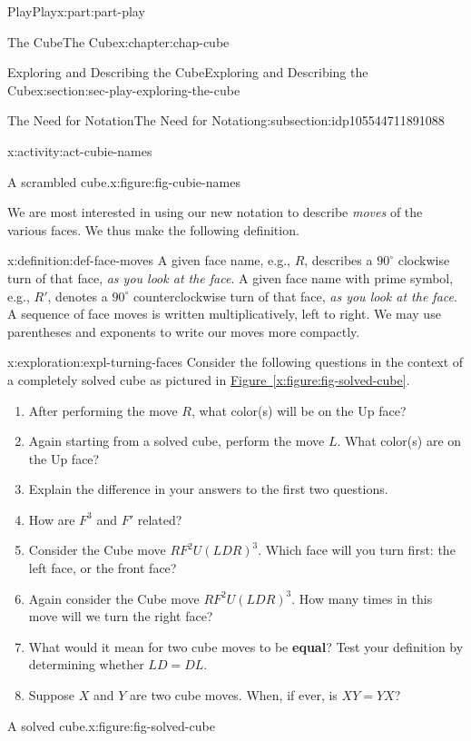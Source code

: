 \documentclass[oneside,10pt,]{book}
\newcommand{\xreffont}{\relax}
\newcommand{\terminology}[1]{\textbf{#1}}
\numberwithin{equation}{section}
\begin{document}
\begin{partptx}{Play}{}{Play}{}{}{x:part:part-play}
\begin{chapterptx}{The Cube}{}{The Cube}{}{}{x:chapter:chap-cube}
\begin{sectionptx}{Exploring and Describing the Cube}{}{Exploring and Describing the Cube}{}{}{x:section:sec-play-exploring-the-cube}
\begin{subsectionptx}{The Need for Notation}{}{The Need for Notation}{}{}{g:subsection:idp105544711891088}
\begin{activity}{}{x:activity:act-cubie-names}
\begin{figureptx}{A scrambled cube.}{x:figure:fig-cubie-names}{}
\tcblower
\end{figureptx}%
\end{activity}%
We are most interested in using our new notation to describe \emph{moves} of the various faces. We thus make the following definition.%
\begin{definition}{}{x:definition:def-face-moves}%
%
A given face name, e.g., \(R\), describes a \(90^\circ\) clockwise turn of that face, \emph{as you look at the face}. A given face name with prime symbol, e.g., \(R'\), denotes a \(90^\circ\) counterclockwise turn of that face, \emph{as you look at the face}. A sequence of face moves is written multiplicatively, left to right. We may use parentheses and exponents to write our moves more compactly.%
\end{definition}
\begin{exploration}{}{x:exploration:expl-turning-faces}%
Consider the following questions in the context of a completely solved cube as pictured in \hyperref[x:figure:fig-solved-cube]{Figure~{\xreffont\ref{x:figure:fig-solved-cube}}}.%
%
\begin{enumerate}
\item{}After performing the move \(R\), what color(s) will be on the Up face?%
\item{}Again starting from a solved cube, perform the move \(L\). What color(s) are on the Up face?%
\item{}Explain the difference in your answers to the first two questions.%
\item{}How are \(F^3\) and \(F'\) related?%
\item{}Consider the Cube move \(RF^2 U (LDR)^3\). Which face will you turn first: the left face, or the front face?%
\item{}Again consider the Cube move \(RF^2 U (LDR)^3\). How many times in this move will we turn the right face?%
\item{}What would it mean for two cube moves to be \terminology{equal}? Test your definition by determining whether \(LD = DL\).%
\item{}Suppose \(X\) and \(Y\) are two cube moves. When, if ever, is \(XY = YX\)?%
\end{enumerate}
\begin{figureptx}{A solved cube.}{x:figure:fig-solved-cube}{}%
\begin{image}{0.25}{0.5}{0.25}%

\end{image}
\end{figureptx}
\end{exploration}
\end{subsectionptx}
\end{sectionptx}
\end{chapterptx}
\end{partptx}
\end{document}
